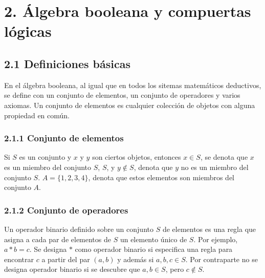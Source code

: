 
\newpage
\section*{2. \'{A}lgebra booleana y compuertas l\'{o}gicas}
\paragraph*{}
\normalsize

\subsection*{2.1 Definiciones b\'{a}sicas}
En el \'{a}lgebra booleana, al igual que en todos los sitemas matem\'{a}ticos deductivos,
se define con un conjunto de elementos, un conjunto de operadores y varios axiomas.
Un conjunto de elementos es cualquier colecci\'{o}n de objetos con alguna propiedad en com\'{u}n.

\subsubsection*{2.1.1 Conjunto de elementos}
Si $S$ es un conjunto y $x$ y $y$ son ciertos objetos, entonces $x \in S$, se denota que $x$
es un miembro del conjunto $S$, $S$, y $y \notin S$, denota que $y$ no es un miembro del conjunto
$S$. $A = \{1, 2, 3, 4\}$, denota que estos elementos son miembros del conjunto $A$.

\subsubsection*{2.1.2 Conjunto de operadores}
Un operador binario definido sobre un conjunto $S$ de elementos es una regla que asigna a cada
par de elementos de $S$ un elemento \'{u}nico de $S$. Por ejemplo, $a * b = c$. Se designa $*$
como operador binario si especifica una regla para encontrar $c$ a partir del par $(a, b)$ y
adem\'{a}s si $a, b, c \in S$. Por contraparte no se designa operador binario si se descubre que
$a, b \in S$, pero $c \notin S$.

